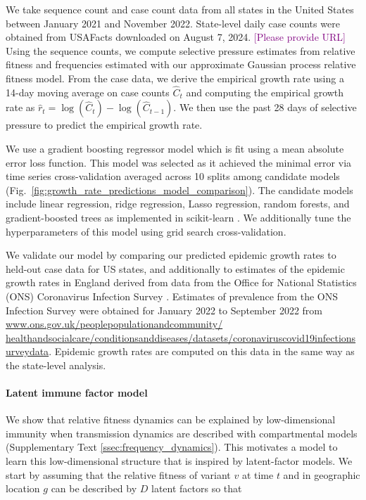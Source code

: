 \documentclass[11pt,oneside,letterpaper]{article}
\def\tbc#1{\textcolor{purple}{[#1]}}
\begin{document}
We take sequence count and case count data from all states in the United States between January 2021 and November 2022.
State-level daily case counts were obtained from USAFacts downloaded on August 7, 2024.
\tbc{Please provide URL}
Using the sequence counts, we compute selective pressure estimates from relative fitness and frequencies estimated with our approximate Gaussian process relative fitness model.
From the case data, we derive the empirical growth rate using a 14-day moving average on case counts $\hat{C}_{t}$ and computing the empirical growth rate as $\hat{r}_{t} = \log(\hat{C}_{t}) - \log(\hat{C}_{t-1})$.
We then use the past 28 days of selective pressure to predict the empirical growth rate.

We use a gradient boosting regressor model which is fit using a mean absolute error loss function.
This model was selected as it achieved the minimal error via time series cross-validation averaged across 10 splits among candidate models (Fig.~\ref{fig:growth_rate_predictions_model_comparison}).
The candidate models include linear regression, ridge regression, Lasso regression, random forests, and gradient-boosted trees as implemented in scikit-learn \cite{scikit-learn}.
We additionally tune the hyperparameters of this model using grid search cross-validation.

We validate our model by comparing our predicted epidemic growth rates to held-out case data for US states, and additionally to estimates of the epidemic growth rates in England derived from data from the Office for National Statistics (ONS) Coronavirus Infection Survey \cite{pouwels2021community}.
Estimates of prevalence from the ONS Infection Survey were obtained for January 2022 to September 2022 from \href{https://www.ons.gov.uk/peoplepopulationandcommunity/healthandsocialcare/conditionsanddiseases/datasets/coronaviruscovid19infectionsurveydata}{www.ons.gov.uk/peoplepopulationandcommunity/ healthandsocialcare/conditionsanddiseases/datasets/coronaviruscovid19infectionsurveydata}.
Epidemic growth rates are computed on this data in the same way as the state-level analysis.

\paragraph{Latent immune factor model}

We show that relative fitness dynamics can be explained by low-dimensional immunity when transmission dynamics are described with compartmental models (Supplementary Text \ref{ssec:frequency_dynamics}).
This motivates a model to learn this low-dimensional structure that is inspired by latent-factor models.
We start by assuming that the relative fitness of variant $v$ at time $t$ and in geographic location $g$ can be described by $D$ latent factors so that
\end{document}
